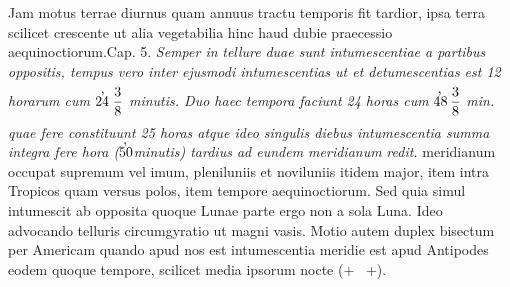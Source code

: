 \pstart 
[101 v\textsuperscript{o}]  Jam motus terrae\protect{} diurnus quam annuus tractu temporis fit tardior, ipsa terra\protect{} scilicet crescente ut alia vegetabilia hinc haud dubie praecessio aequinoctiorum.\pend \pstart Cap. 5. \textit{Semper in }\textit{tellure}\protect{}\textit{ duae sunt intumescentiae a partibus oppositis, tempus vero inter }\textit{ ejusmodi intumescentias ut et detumescentias est 12 horarum cum }$\displaystyle 24\hspace{-6pt}\raisebox{9pt}{,}\hspace{6pt}\frac{3}{8}\rule[-4mm]{0mm}{10mm}$\textit{ minutis. Duo haec tempora faciunt 24 horas cum }$\displaystyle 48\hspace{-7pt}\raisebox{9pt}{,}\hspace{6pt}\frac{3}{8}\rule[-4mm]{0mm}{10mm}$\textit{ min. quae fere constituunt 25 horas atque ideo singulis diebus intumescentia summa integra fere hora ($\displaystyle50\hspace{-7pt}\raisebox{9pt}{,}$ minutis) tardius ad eundem meridianum}\protect{}\textit{ redit.}  meridianum\protect{} occupat supremum vel imum,  pleniluniis et noviluniis itidem major, item intra Tropicos\protect{} quam versus polos\protect{}, item tempore aequinoctiorum. Sed quia simul intumescit ab opposita quoque Lunae\protect{} parte ergo non a sola Luna\protect{}. Ideo advocando telluris\protect{} circumgyratio ut magni vasis. Motio autem duplex  bisectum per Americam quando apud nos est intumescentia meridie est apud Antipodes\protect{} eodem quoque tempore, scilicet media ipsorum nocte (+ \Denarius~+).\pend 
